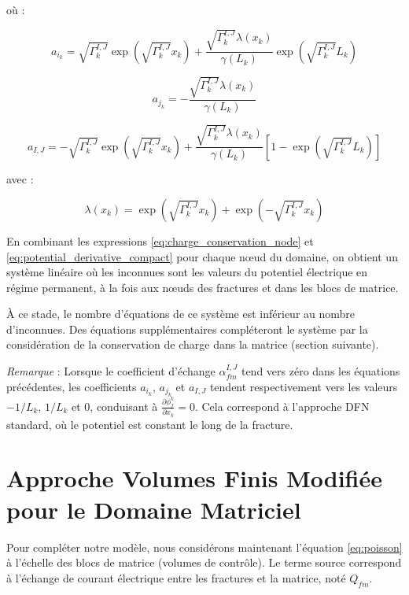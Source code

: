 où :

\begin{equation}
a_{i_k} = \sqrt{\Gamma_k^{I,J}} \exp(\sqrt{\Gamma_k^{I,J}} x_k) + \frac{\sqrt{\Gamma_k^{I,J}} \lambda(x_k)}{\gamma(L_k)} \exp(\sqrt{\Gamma_k^{I,J}} L_k)
\label{eq:aik}
\end{equation}

\begin{equation}
a_{j_k} = -\frac{\sqrt{\Gamma_k^{I,J}} \lambda(x_k)}{\gamma(L_k)}
\label{eq:ajk}
\end{equation}

\begin{equation}
a_{I,J} = -\sqrt{\Gamma_k^{I,J}} \exp(\sqrt{\Gamma_k^{I,J}} x_k) + \frac{\sqrt{\Gamma_k^{I,J}} \lambda(x_k)}{\gamma(L_k)} \left[1 - \exp(\sqrt{\Gamma_k^{I,J}} L_k)\right]
\label{eq:aIJ}
\end{equation}

avec :

\begin{equation}
\lambda(x_k) = \exp(\sqrt{\Gamma_k^{I,J}} x_k) + \exp(-\sqrt{\Gamma_k^{I,J}} x_k)
\end{equation}

En combinant les expressions \eqref{eq:charge_conservation_node} et \eqref{eq:potential_derivative_compact} pour chaque nœud du domaine, on obtient un système linéaire où les inconnues sont les valeurs du potentiel électrique en régime permanent, à la fois aux nœuds des fractures et dans les blocs de matrice.

À ce stade, le nombre d'équations de ce système est inférieur au nombre d'inconnues. Des équations supplémentaires compléteront le système par la considération de la conservation de charge dans la matrice (section suivante).

\textit{Remarque} : Lorsque le coefficient d'échange $\alpha_{fm}^{I,J}$ tend vers zéro dans les équations précédentes, les coefficients $a_{i_k}$, $a_{j_k}$ et $a_{I,J}$ tendent respectivement vers les valeurs $-1/L_k$, $1/L_k$ et $0$, conduisant à $\frac{\partial \phi_f^k}{\partial x_k} = 0$. Cela correspond à l'approche DFN standard, où le potentiel est constant le long de la fracture.

\section{Approche Volumes Finis Modifiée pour le Domaine Matriciel}
\label{sec:fv}

Pour compléter notre modèle, nous considérons maintenant l'équation \eqref{eq:poisson} à l'échelle des blocs de matrice (volumes de contrôle). Le terme source correspond à l'échange de courant électrique entre les fractures et la matrice, noté $Q_{fm}$.

